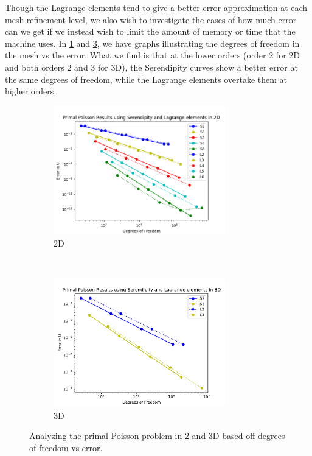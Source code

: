 \documentclass[manuscript,screen]{acmart}
\begin{document}
\noindent Though the Lagrange elements tend to give a better error approximation at each mesh refinement level, we also wish to investigate the cases of how much error can we get if we instead wish to limit the amount of memory or time that the machine uses.  In \ref{fig:2dPrimalDofs} and \ref{fig:3dPrimalDofs}, we have graphs illustrating the degrees of freedom in the mesh vs the error.  What we find is that at the lower orders (order 2 for 2D and both orders 2 and 3 for 3D), the Serendipity curves show a better error  at the same degrees of freedom, while the Lagrange elements overtake them at higher orders.  

\begin{figure}[h!]
  \centering
  \begin{subfigure}[h]{0.5\textwidth}
    \centering
    \includegraphics[height=2.2in]{2dPrimalPoisson.png}
    \caption{2D}
    \label{fig:2dPrimalDofs}
  \end{subfigure}
  ~
  \begin{subfigure}[h]{0.5\textwidth}
    \centering
    \includegraphics[height=2.2in]{3dPrimalDofs.pdf}
    \caption{3D}
    \label{fig:3dPrimalDofs}
  \end{subfigure}
  \caption{Analyzing the primal Poisson problem in 2 and 3D based off degrees of freedom vs error.}
\end{figure}  

\end{document}

